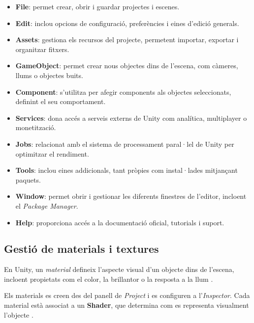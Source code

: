 \documentclass[a4paper,11pt,DIV=13,headings=normal,abstract=true,twoside=semi]{article}
\begin{document}
\begin{itemize}
\item \textbf{File}: permet crear, obrir i guardar projectes i escenes.
\item \textbf{Edit}: inclou opcions de configuració, preferències i eines d'edició generals.
\item \textbf{Assets}: gestiona els recursos del projecte, permetent importar, exportar i organitzar fitxers.
\item \textbf{GameObject}: permet crear nous objectes dins de l'escena, com càmeres, llums o objectes buits.
\item \textbf{Component}: s'utilitza per afegir components als objectes seleccionats, definint el seu comportament.
\item \textbf{Services}: dona accés a serveis externs de Unity com analítica, multiplayer o monetització.
\item \textbf{Jobs}: relacionat amb el sistema de processament paral·lel de Unity per optimitzar el rendiment.
\item \textbf{Tools}: inclou eines addicionals, tant pròpies com instal·lades mitjançant paquets.
\item \textbf{Window}: permet obrir i gestionar les diferents finestres de l'editor, incloent el \textit{Package Manager}.
\item \textbf{Help}: proporciona accés a la documentació oficial, tutorials i suport.

\end{itemize}

\subsection{Gestió de materials i textures}


En Unity, un \textit{material} defineix l'aspecte visual d'un objecte dins de l'escena, incloent propietats com el color, la brillantor o la resposta a la llum \cite{UnityMaterialsIntro}. 

Els materials es creen des del panell de \textit{Project} i es configuren a l'\textit{Inspector}. Cada material està associat a un \textbf{Shader}, que determina com es representa visualment l'objecte \cite{UnityShaders}.
\end{document}

